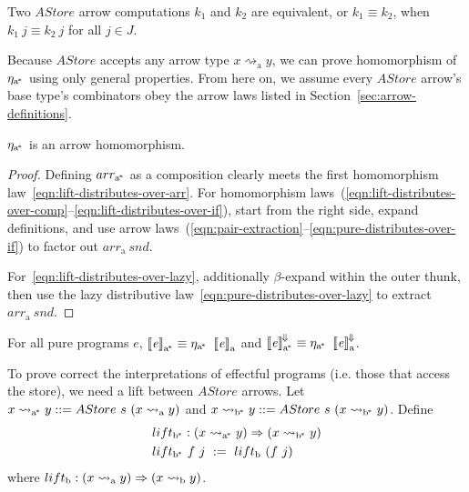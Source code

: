 \documentclass[preprint]{sigplanconf}
\newcommand{\arrow}{\rightsquigarrow}
\newcommand{\conv}{^{\mspace{-2mu}\Downarrow\mspace{-2mu}}}
\newcommand{\meaningofconv}[1]{\left\llbracket{#1}\right\rrbracket\conv}
\newcommand{\arrowlift}{\ensuremath{lift}}
\newcommand{\arrowarr}{\ensuremath{arr}}
\newcommand{\arrowtrans}{\ensuremath{\eta}}
\newcommand{\gen}{_\mathrm{a}}
\newcommand{\genb}{_\mathrm{b}}
\newcommand{\genc}{_\mathrm{a^{\mspace{-2mu}*}}}
\newcommand{\gend}{_\mathrm{b^{\mspace{-2mu}*}}}
\begin{document}
\begin{definition}
Two $AStore$ arrow computations $k_1$ and $k_2$ are equivalent, or $k_1 \equiv k_2$, when $k_1~j \equiv k_2~j$ for all $j \in J$.
\end{definition}

Because $AStore$ accepts any arrow type $x \arrow\gen y$, we can prove homomorphism of $\arrowtrans\genc$ using only general properties.
From here on, we assume every $AStore$ arrow's base type's combinators obey the arrow laws listed in Section~\ref{sec:arrow-definitions}.

\begin{theorem}
$\arrowtrans\genc$ is an arrow homomorphism.
\end{theorem}
\begin{proof}
Defining $\arrowarr\genc$ as a composition clearly meets the first homomorphism law~\eqref{eqn:lift-distributes-over-arr}.
For homomorphism laws~(\ref{eqn:lift-distributes-over-comp}--\ref{eqn:lift-distributes-over-if}), start from the right side, expand definitions, and use arrow laws~(\ref{eqn:pair-extraction}--\ref{eqn:pure-distributes-over-if}) to factor out $\arrowarr\gen~snd$.

For~\eqref{eqn:lift-distributes-over-lazy}, additionally $\beta$-expand within the outer thunk, then use the lazy distributive law~\eqref{eqn:pure-distributes-over-lazy} to extract $\arrowarr\gen~snd$.
\end{proof}

\begin{corollary}
For all pure programs $\mathit{e}$, $\meaningof{\mathit{e}}\genc \equiv \arrowtrans\genc~\meaningof{\mathit{e}}\gen$ and $\meaningofconv{\mathit{e}}\genc \equiv \arrowtrans\genc~\meaningofconv{\mathit{e}}\gen$.
\label{cor:pure-astore-semantic-correctness}
\end{corollary}

To prove correct the interpretations of effectful programs (i.e. those that access the store), we need a lift between $AStore$ arrows.
Let $x \arrow\genc y ::= AStore~s~(x \arrow\gen y)$ and $x \arrow\gend y ::= AStore~s~(x \arrow\gend y)$.
Define
\begin{equation}
\begin{aligned}
	&\arrowlift\gend : (x \arrow\genc y) \tto (x \arrow\gend y) \\
	&\arrowlift\gend~f~j \ := \ \arrowlift\genb~(f~j)
\end{aligned}
\end{equation}
where $\arrowlift\genb : (x \arrow\gen y) \tto (x \arrow\genb y)$.
\end{document}
